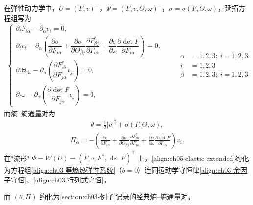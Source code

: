 \documentclass[../../main.tex]{subfiles}
\begin{document}
在弹性动力学中，$U=(F,v)^{\top}$，$\Psi=(F,v,\Theta,\omega)^{\top}$，$\sigma=\sigma(F,\Theta,\omega)$，延拓方程组写为
\begin{align}
\begin{cases}
\partial_{t}F_{i\alpha}-\partial_{\alpha}v_{i}=0,\\
\partial_{t}v_{i}-\partial_{\alpha}\left(\dfrac{\partial\sigma}{\partial F_{i\alpha}}+\dfrac{\partial\sigma}{\partial\Theta_{\beta j}}\dfrac{\partial F_{\beta j}^{*}}{\partial F_{i\alpha}}+\dfrac{\partial\sigma}{\partial\omega}\dfrac{\partial\det F}{\partial F_{i\alpha}}\right)=0,\\
\partial_{t}\Theta_{\beta i}-\partial_{\alpha}\left(\dfrac{\partial F_{\beta i}^{*}}{\partial F_{j\alpha}}v_{j}\right)=0,\\
\partial_{t}\omega-\partial_{\alpha}\left(\dfrac{\partial\det F}{\partial F_{j\alpha}}v_{j}\right)=0,
\end{cases}\label{align:ch05-elastic-extended}
\qquad\begin{aligned}
\alpha&=1,2,3;\ i=1,2,3\\
i&=1,2,3\\
\beta&=1,2,3;\ i=1,2,3
\end{aligned}
\end{align}
而熵--熵通量对为
\begin{align}
\theta=\frac{1}{2}|v|^{2}+\sigma(F,\Theta,\omega),\label{align:ch05-elastic-theta}
\end{align}
\begin{align}
\Pi_{\alpha}=-\left(\frac{\partial\sigma}{\partial F_{i\alpha}}+\frac{\partial\sigma}{\partial\Theta_{\beta j}}\frac{\partial F_{\beta j}^{*}}{\partial F_{i\alpha}}+\frac{\partial\sigma}{\partial\omega}\frac{\partial\det F}{\partial F_{i\alpha}}\right)v_{i}.\label{align:ch05-elastic-Pi}
\end{align}
在"流形" $\Psi=W(U)=(F,v,F^{*},\det F)^{\top}$ 上，\eqref{align:ch05-elastic-extended}约化为方程组\eqref{align:ch03-等熵热弹性系统}（$b=0$）连同运动学守恒律\eqref{align:ch03-余因子守恒}、\eqref{align:ch03-行列式守恒}，


而 $(\theta,\Pi)$ 约化为\cref{section:ch03-例子}记录的经典熵--熵通量对。
\end{document}
